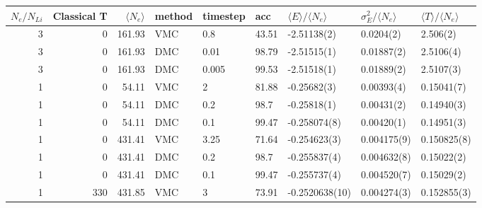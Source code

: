 \begin{tabular}{rrrllllll}
\toprule
 $N_e/N_{Li}$ &  Classical T &  $\langle N_e\rangle$ & method & timestep &    acc & $\langle E\rangle/\langle N_e\rangle$ & $\sigma_E^2/\langle N_e\rangle$ & $\langle T\rangle/\langle N_e\rangle$ \\
\midrule
            3 &            0 &                161.93 &    VMC &      0.8 &  43.51 &                           -2.51138(2) &                       0.0204(2) &                              2.506(2) \\
            3 &            0 &                161.93 &    DMC &     0.01 &  98.79 &                           -2.51515(1) &                      0.01887(2) &                             2.5106(4) \\
            3 &            0 &                161.93 &    DMC &    0.005 &  99.53 &                           -2.51518(1) &                      0.01889(2) &                             2.5107(3) \\
            1 &            0 &                 54.11 &    VMC &        2 &  81.88 &                           -0.25682(3) &                      0.00393(4) &                            0.15041(7) \\
            1 &            0 &                 54.11 &    DMC &      0.2 &   98.7 &                           -0.25818(1) &                      0.00431(2) &                            0.14940(3) \\
            1 &            0 &                 54.11 &    DMC &      0.1 &  99.47 &                          -0.258074(8) &                      0.00420(1) &                            0.14951(3) \\
            1 &            0 &                431.41 &    VMC &     3.25 &  71.64 &                          -0.254623(3) &                     0.004175(9) &                           0.150825(8) \\
            1 &            0 &                431.41 &    DMC &      0.2 &   98.7 &                          -0.255837(4) &                     0.004632(8) &                            0.15022(2) \\
            1 &            0 &                431.41 &    DMC &      0.1 &  99.47 &                          -0.255737(4) &                     0.004520(7) &                            0.15029(2) \\
            1 &          330 &                431.85 &    VMC &        3 &  73.91 &                        -0.2520638(10) &                     0.004274(3) &                           0.152855(3) \\

\end{tabular}
